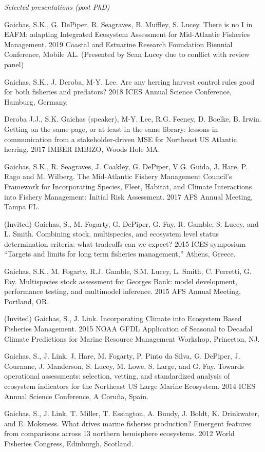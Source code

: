 \documentclass[11pt, a4paper]{awesome-cv}
\begin{document}
\emph{Selected presentations (post PhD)}

Gaichas, S.K., G. DePiper, R. Seagraves, B. Muffley, S. Lucey. There is
no I in EAFM: adapting Integrated Ecosystem Assessment for Mid-Atlantic
Fisheries Management. 2019 Coastal and Estuarine Research Foundation
Biennial Conference, Mobile AL. (Presented by Sean Lucey due to conflict
with review panel)

Gaichas, S.K., J. Deroba, M-Y. Lee. Are any herring harvest control
rules good for both fisheries and predators? 2018 ICES Annual Science
Conference, Hamburg, Germany.

Deroba J.J., S.K. Gaichas (speaker), M‐Y. Lee, R.G. Feeney, D. Boelke,
B. Irwin. Getting on the same page, or at least in the same library:
lessons in communication from a stakeholder-driven MSE for Northeast US
Atlantic herring. 2017 IMBER IMBIZO, Woods Hole MA.

Gaichas, S.K., R. Seagraves, J. Coakley, G. DePiper, V.G. Guida, J.
Hare, P. Rago and M. Wilberg. The Mid-Atlantic Fishery Management
Council's Framework for Incorporating Species, Fleet, Habitat, and
Climate Interactions into Fishery Management: Initial Risk Assessment.
2017 AFS Annual Meeting, Tampa FL.

(Invited) Gaichas, S., M. Fogarty, G. DePiper, G. Fay, R. Gamble, S.
Lucey, and L. Smith. Combining stock, multispecies, and ecosystem level
status determination criteria: what tradeoffs can we expect? 2015 ICES
symposium ``Targets and limits for long term fisheries management,''
Athens, Greece.

Gaichas, S.K., M. Fogarty, R.J. Gamble, S.M. Lucey, L. Smith, C.
Perretti, G. Fay. Multispecies stock assessment for Georges Bank: model
development, performance testing, and multimodel inference. 2015 AFS
Annual Meeting, Portland, OR.

(Invited) Gaichas, S., J. Link. Incorporating Climate into Ecosystem
Based Fisheries Management. 2015 NOAA GFDL Application of Seasonal to
Decadal Climate Predictions for Marine Resource Management Workshop,
Princeton, NJ.

Gaichas, S., J. Link, J. Hare, M. Fogarty, P. Pinto da Silva, G.
DePiper, J. Cournane, J. Manderson, S. Lucey, M. Lowe, S. Large, and G.
Fay. Towards operational assessments: selection, vetting, and
standardized analysis of ecosystem indicators for the Northeast US Large
Marine Ecosystem. 2014 ICES Annual Science Conference, A Coruña, Spain.

Gaichas, S., J. Link, T. Miller, T. Essington, A. Bundy, J. Boldt, K.
Drinkwater, and E. Moksness. What drives marine fisheries production?
Emergent features from comparisons across 13 northern hemisphere
ecosystems. 2012 World Fisheries Congress, Edinburgh, Scotland.
\end{document}
